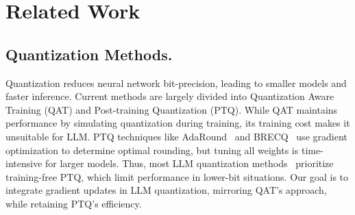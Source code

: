 \documentclass{article} %
\begin{document}

\section{Related Work}

\subsection{Quantization Methods.}
Quantization reduces neural network bit-precision, leading to smaller models and faster inference. Current methods are largely divided into Quantization Aware Training (QAT)\citep{llmqat} and Post-training Quantization (PTQ)\citep{smoothquant,gptq}. While QAT maintains performance by simulating quantization during training, its training cost makes it unsuitable for LLM. PTQ techniques like AdaRound~\citep{adaround} and BRECQ~\citep{brecq} use gradient optimization to determine optimal rounding, but tuning all weights is time-intensive for larger models. Thus, most LLM quantization methods~\citep{smoothquant,gptq,spqr,owq,outlier-plus} prioritize training-free PTQ, which limit performance in lower-bit situations. Our goal is to integrate gradient updates in LLM quantization, mirroring QAT's approach, while retaining PTQ's efficiency.

\end{document}
